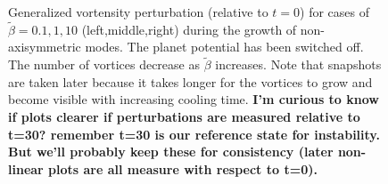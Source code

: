 




\begin{figure}
  \centering
\hfill
\hfill
  \caption{Generalized vortensity perturbation (relative to $t=0$) for
    cases of $\tilde{\beta}=0.1,1,10$ (left,middle,right) during
    the growth of non-axisymmetric modes. The planet potential has
    been switched off.  The number of vortices
    decrease as $\tilde{\beta}$ increases. Note that snapshots are
    taken later because it takes longer for the vortices to grow and
    become visible with increasing cooling time. 
    \label{2Dlinear} {\bf I'm curious to know if plots clearer if
      perturbations are measured relative to t=30? remember t=30 is
      our reference state for instability. But we'll probably keep
      these for consistency (later non-linear plots are all measure
      with respect to t=0).}} 
\end{figure}

